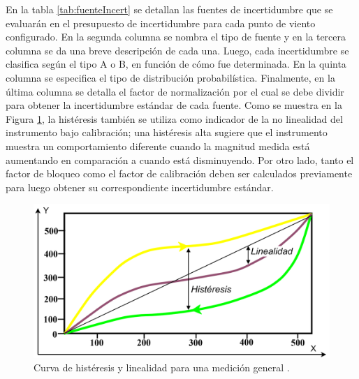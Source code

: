 En la tabla \ref{tab:fuenteIncert} se detallan las fuentes de incertidumbre que se evaluarán en el presupuesto de incertidumbre para cada punto de viento configurado. En la segunda columna se nombra el tipo de fuente y en la tercera columna se da una breve descripción de cada una. Luego, cada incertidumbre se clasifica según el tipo A o B, en función de cómo fue determinada. En la quinta columna se especifica el tipo de distribución probabilística. Finalmente, en la última columna se detalla el factor de normalización por el cual se debe dividir para obtener la incertidumbre estándar de cada fuente. Como se muestra en la Figura \ref{fig:histeresis}, la histéresis también se utiliza como indicador de la no linealidad del instrumento bajo calibración; una histéresis alta sugiere que el instrumento muestra un comportamiento diferente cuando la magnitud medida está aumentando en comparación a cuando está disminuyendo. Por otro lado, tanto el factor de bloqueo como el factor de calibración deben ser calculados previamente para luego obtener su correspondiente incertidumbre estándar.
\begin{figure}[H]
    \centering
    \includegraphics[width=0.85\linewidth]{Figuras/calculoIncertidumbre/histeresis.png}
    \caption{Curva de histéresis y linealidad para una medición general \cite{Workshop_WMO2021}.}
    \label{fig:histeresis}
\end{figure}




